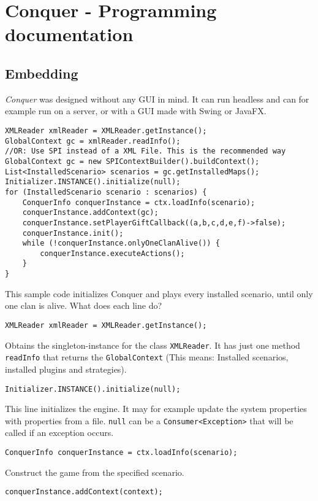 \documentclass{article}
\begin{document}
\tableofcontents
\newpage
\section{Conquer - Programming documentation}
\subsection{Embedding}
\textit{Conquer} was designed without any GUI in mind. It can run headless and can for example run on a server, or with a GUI made with Swing or JavaFX.
\begin{verbatim}
XMLReader xmlReader = XMLReader.getInstance();
GlobalContext gc = xmlReader.readInfo();
//OR: Use SPI instead of a XML File. This is the recommended way
GlobalContext gc = new SPIContextBuilder().buildContext();
List<InstalledScenario> scenarios = gc.getInstalledMaps();
Initializer.INSTANCE().initialize(null);
for (InstalledScenario scenario : scenarios) {
	ConquerInfo conquerInstance = ctx.loadInfo(scenario);
	conquerInstance.addContext(gc);
	conquerInstance.setPlayerGiftCallback((a,b,c,d,e,f)->false);
	conquerInstance.init();
	while (!conquerInstance.onlyOneClanAlive()) {
		conquerInstance.executeActions();
	}
}
\end{verbatim}
This sample code initializes Conquer and plays every installed scenario, until only one clan is alive.\newline
What does each line do?\newline
\begin{verbatim}
XMLReader xmlReader = XMLReader.getInstance();
\end{verbatim}
Obtains the singleton-instance for the class \texttt{XMLReader}. It has just one method \texttt{readInfo} that returns the \texttt{GlobalContext} (This means: Installed scenarios,
installed plugins and strategies).
\begin{verbatim}
Initializer.INSTANCE().initialize(null);
\end{verbatim}
This line initializes the engine. It may for example update the system properties with properties from a file. \texttt{null} can be a \texttt{Consumer<Exception>} that will be called if an exception
occurs.
\begin{verbatim}
ConquerInfo conquerInstance = ctx.loadInfo(scenario);
\end{verbatim}
Construct the game from the specified scenario.
\begin{verbatim}
conquerInstance.addContext(context);
\end{verbatim}
\end{document}
